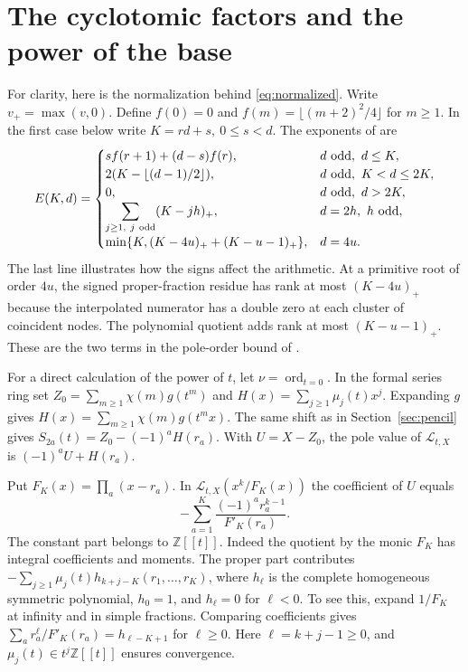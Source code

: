 \documentclass[11pt,letterpaper]{article}
\newcommand{\Z}{\mathbb Z}
\newcommand{\LL}{\mathcal L}
\newcommand{\ord}{\operatorname{ord}}
\begin{document}
\clearpage
\appendix
\section{The cyclotomic factors and the power of the base}\label{sec:exponents}
For clarity, here is the normalization behind \eqref{eq:normalized}.
Write \(v_+=\max(v,0)\). Define \(f(0)=0\) and
\(f(m)=\lfloor(m+2)^2/4\rfloor\) for \(m\ge1\).
In the first case below write \(K=rd+s,\ 0\le s<d\).
The exponents of \cite[(4.1)]{uplift} are
\[
 E(K,d)=
 \begin{cases}
 s f(r+1)+(d-s)f(r),&d\text{ odd},\ d\le K,\\
 2(K-\lfloor(d-1)/2\rfloor),&d\text{ odd},\ K<d\le2K,\\
 0,&d\text{ odd},\ d>2K,\\
 \displaystyle\sum_{j\ge1,\ j\ {\rm odd}}(K-jh)_+,&d=2h,\ h\text{ odd},\\
 \min\{K,(K-4u)_++(K-u-1)_+\},&d=4u .
 \end{cases}
\]
The last line illustrates how the signs affect the arithmetic. At a
primitive root of order \(4u\), the signed proper-fraction residue has
rank at most \((K-4u)_+\) because the interpolated numerator has a
double zero at each cluster of coincident nodes. The polynomial quotient
adds rank at most \((K-u-1)_+\). These are the two terms in the pole-order
bound of \cite[Proposition~4.1]{uplift}.

For a direct calculation of the power of \(t\), let \(\nu=\ord_{t=0}\).
In the formal series ring set \(Z_0=\sum_{m\ge1}\chi(m)g(t^m)\) and
\(H(x)=\sum_{j\ge1}\mu_j(t)x^j\).
Expanding \(g\) gives \(H(x)=\sum_{m\ge1}\chi(m)g(t^m x)\). The same
shift as in Section~\ref{sec:pencil} gives
\(S_{2a}(t)=Z_0-(-1)^aH(r_a)\). With \(U=X-Z_0\), the pole value of
\(\LL_{t,X}\) is \((-1)^a U+H(r_a)\).

Put \(F_K(x)=\prod_a(x-r_a)\). In \(\LL_{t,X}(x^k/F_K(x))\) the
coefficient of \(U\) equals
\[
      -\sum_{a=1}^K\frac{(-1)^a r_a^{k-1}}{F'_K(r_a)} .
\]
The constant part belongs to \(\Z[[t]]\). Indeed the quotient by the
monic \(F_K\) has integral coefficients and moments. The proper part
contributes \(-\sum_{j\ge1}\mu_j(t)h_{k+j-K}(r_1,\ldots,r_K)\),
where \(h_\ell\) is the complete homogeneous symmetric polynomial,
\(h_0=1\), and \(h_\ell=0\) for \(\ell<0\).
To see this, expand \(1/F_K\) at infinity and in simple fractions.
Comparing coefficients gives
\(\sum_a r_a^\ell/F'_K(r_a)=h_{\ell-K+1}\) for \(\ell\ge0\).
Here \(\ell=k+j-1\ge0\), and \(\mu_j(t)\in t^j\Z[[t]]\) ensures
convergence.
\end{document}
